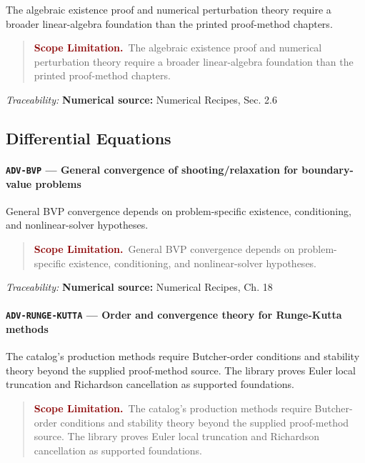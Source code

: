 \documentclass[10pt]{article}
\newcommand{\pidraw}[1]{\begingroup\urlstyle{tt}\nolinkurl{#1}\endgroup}
\theoremstyle{definition}
\theoremstyle{remark}
\newenvironment{scopelimitation}
{\begin{quote}\small\noindent\textbf{\textcolor{darkred}{Scope Limitation.}}\ }
{\end{quote}}
\begin{document}
The algebraic existence proof and numerical perturbation theory require a broader linear-algebra foundation than the printed proof-method chapters.

\begin{scopelimitation}The algebraic existence proof and numerical perturbation theory require a broader linear-algebra foundation than the printed proof-method chapters.\end{scopelimitation}

\smallskip\noindent\textit{Traceability:} \textbf{Numerical source:} Numerical Recipes, Sec. 2.6\par

\subsection{Differential Equations}

\label{prf:ADV-BVP}

\paragraph{\pidraw{ADV-BVP} --- General convergence of shooting/relaxation for boundary-value problems}

General BVP convergence depends on problem-specific existence, conditioning, and nonlinear-solver hypotheses.

\begin{scopelimitation}General BVP convergence depends on problem-specific existence, conditioning, and nonlinear-solver hypotheses.\end{scopelimitation}

\smallskip\noindent\textit{Traceability:} \textbf{Numerical source:} Numerical Recipes, Ch. 18\par

\label{prf:ADV-RUNGE-KUTTA}

\paragraph{\pidraw{ADV-RUNGE-KUTTA} --- Order and convergence theory for Runge-Kutta methods}

The catalog's production methods require Butcher-order conditions and stability theory beyond the supplied proof-method source. The library proves Euler local truncation and Richardson cancellation as supported foundations.

\begin{scopelimitation}The catalog's production methods require Butcher-order conditions and stability theory beyond the supplied proof-method source. The library proves Euler local truncation and Richardson cancellation as supported foundations.\end{scopelimitation}
\end{document}
